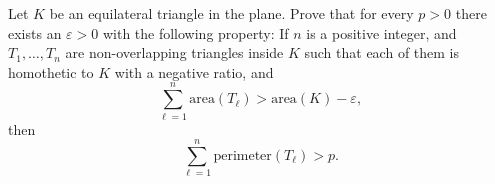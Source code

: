 Let \(K\) be an equilateral triangle in the plane. Prove that for every \(p>0\) there exists an \(\varepsilon>0\) with the following property: If \(n\) is a positive integer, and \(T_1,\ldots,T_n\) are non-overlapping triangles inside \(K\) such that each of them is homothetic to \(K\) with a negative ratio, and \[ \sum_{\ell=1}^n \textrm{area}(T_\ell) > \textrm{area}(K)-\varepsilon, \]then \[ \sum_{\ell=1}^n \textrm{perimeter}(T_\ell) > p. \]
